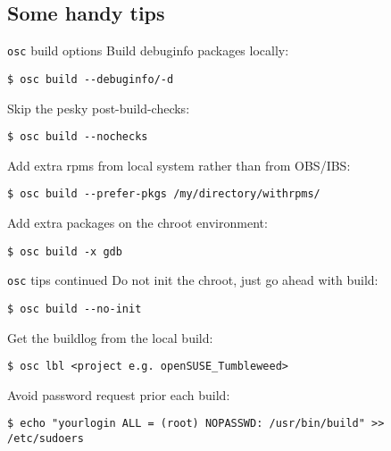\documentclass{beamer}
\begin{document}
\subsection{Some handy tips}

\begin{frame}[fragile]{\texttt{osc} build options}
Build debuginfo packages locally:
\begin{small}
\begin{verbatim}$ osc build --debuginfo/-d\end{verbatim}
\end{small}
Skip the pesky post-build-checks:
\begin{small}
\begin{verbatim}$ osc build --nochecks\end{verbatim}
\end{small}
Add extra rpms from local system rather than from OBS/IBS:
\begin{small}
\begin{verbatim}$ osc build --prefer-pkgs /my/directory/withrpms/\end{verbatim}
\end{small}
Add extra packages on the chroot environment:
\begin{small}
\begin{verbatim}$ osc build -x gdb\end{verbatim}
\end{small}
\end{frame}

\begin{frame}[fragile]{\texttt{osc} tips continued}
Do not init the chroot, just go ahead with build:
\begin{small}
\begin{verbatim}$ osc build --no-init\end{verbatim}
\end{small}
Get the buildlog from the local build:
\begin{small}
\begin{verbatim}$ osc lbl <project e.g. openSUSE_Tumbleweed>\end{verbatim}
\end{small}
Avoid password request prior each build:
\begin{scriptsize}
\begin{verbatim}$ echo "yourlogin ALL = (root) NOPASSWD: /usr/bin/build" >> /etc/sudoers\end{verbatim}
\end{scriptsize}
\end{frame}
\end{document}
